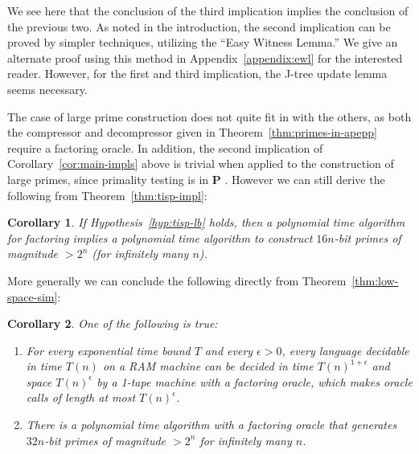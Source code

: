 \documentclass[11pt]{article}
\newtheorem{corollary}{Corollary}
\def\cl{\bf}
\begin{document}
We see here that the conclusion of the third implication implies the conclusion of the previous two. As noted in the introduction, the second implication can be proved by simpler techniques, utilizing the ``Easy Witness Lemma.'' We give an alternate proof using this method in Appendix~\ref{appendix:ewl} for the interested reader. However, for the first and third implication, the J-tree update lemma seems necessary.

The case of large prime construction does not quite fit in with the others, as both the compressor and decompressor given in Theorem~\ref{thm:primes-in-apepp} require a factoring oracle. In addition, the second implication of Corollary~\ref{cor:main-impls} above is trivial when applied to the construction of large primes, since primality testing is in {\cl P} \cite{primes}. However we can still derive the following from Theorem~\ref{thm:tisp-impl}:
\begin{corollary}\label{cor:prime-construction}
If Hypothesis~\ref{hyp:tisp-lb} holds, then a polynomial time algorithm for factoring implies a polynomial time algorithm to construct $16n$-bit primes of magnitude $>2^n$ (for infinitely many $n$).
\end{corollary}

More generally we can conclude the following directly from Theorem~\ref{thm:low-space-sim}:
\begin{corollary}\label{cor:factoring-oracle}
One of the following is true:
\begin{enumerate}
    \item For every exponential time bound $T$ and every $\epsilon>0$, every language decidable in time $T(n)$ on a RAM machine can be decided in time $T(n)^{1+\epsilon}$ and space $T(n)^{\epsilon}$ by a 1-tape machine with a factoring oracle, which makes oracle calls of length at most $T(n)^{\epsilon}$.
    \item There is a polynomial time algorithm with a factoring oracle that generates $32n$-bit primes of magnitude $>2^n$ for infinitely many $n$.
\end{enumerate}
\end{corollary}
\end{document}
